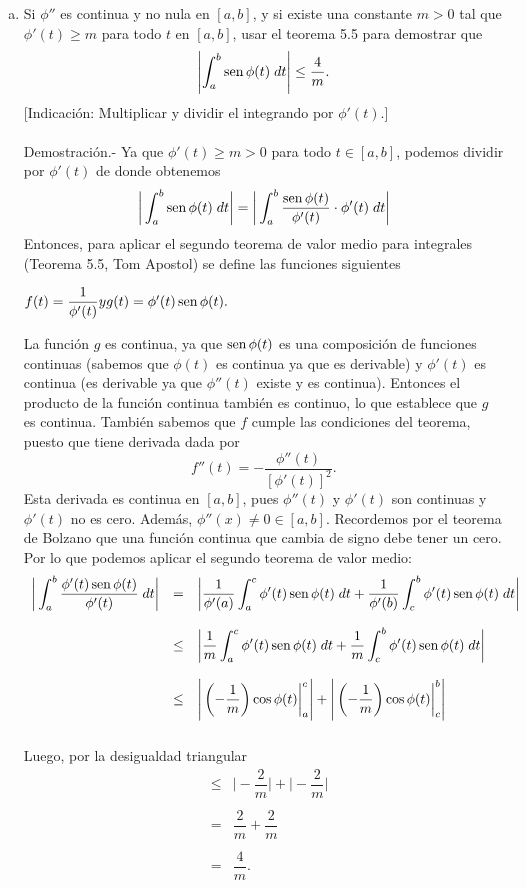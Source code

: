 \begin{enumerate}[\bfseries 1.]
\begin{enumerate}[a)]
	    \item Si $\phi''$ es continua y no nula en $[a,b]$, y si existe una constante $m>0$ tal que $\phi'(t)\geq m$ para todo $t$ en $[a,b]$, usar el teorema 5.5 para demostrar que
	    $$\left|\int_a^b \mathop{\mbox{\normalfont sen}}\nolimits \phi(t) \; dt\right|\leq \dfrac{4}{m}.$$
	    [Indicación: Multiplicar y dividir el integrando por $\phi'(t).$]\\\\
		Demostración.-\; Ya que $\phi'(t)\geq m > 0$ para todo $t\in [a,b]$, podemos dividir por $\phi'(t)$ de donde obtenemos 
		$$\bigg|\int_a^b \mathop{\mbox{\normalfont sen}}\nolimits \phi(t)\; dt\bigg|=\bigg|\int_a^b \dfrac{\mathop{\mbox{\normalfont sen}}\nolimits \phi(t)}{\phi'(t)}\cdot \phi'(t)\; dt\bigg|$$
		Entonces, para aplicar el segundo teorema de valor medio para integrales (Teorema 5.5, Tom Apostol) se define las funciones siguientes
		\begin{center}
		    $f(t)=\dfrac{1}{\phi'(t)} y g(t)=\phi'(t)\mathop{\mbox{\normalfont sen}}\nolimits \phi(t).$
		\end{center}
		La función $g$ es continua, ya que $\mathop{\mbox{\normalfont sen}}\nolimits \phi(t)$ es una composición de funciones continuas (sabemos que $\phi(t)$ es continua ya que es derivable) y $\phi'(t)$ es continua (es derivable ya que $\phi''(t)$ existe y es continua). Entonces el producto de la función continua también es continuo, lo que establece que $g$ es continua. También sabemos que $f$ cumple las condiciones del teorema, puesto que tiene derivada dada por
		$$f''(t)=-\dfrac{\phi''(t)}{\left[\phi'(t)\right]^2}.$$
		Esta derivada es continua en $[a,b]$, pues $\phi''(t)$ y $\phi'(t)$ son continuas y $\phi'(t)$ no es cero. Además, $\phi''(x)\neq 0\in [a,b]$. Recordemos por el teorema de Bolzano que una función continua que cambia de signo debe tener un cero. Por lo que podemos aplicar el segundo teorema de valor medio:
		$$
		\begin{array}{rcl}
		    \bigg|\displaystyle\int_a^b \dfrac{\phi'(t)\mathop{\mbox{\normalfont sen}}\nolimits \phi(t)}{\phi'(t)}\; dt\bigg| &=& \bigg|\dfrac{1}{\phi'(a)}\displaystyle\int_a^c \phi'(t)\mathop{\mbox{\normalfont sen}}\nolimits \phi(t) \; dt + \dfrac{1}{\phi'(b)}\displaystyle\int_c^b \phi'(t)\mathop{\mbox{\normalfont sen}}\nolimits \phi(t)\; dt\bigg|\\\\
		    &\leq& \bigg|\dfrac{1}{m}\displaystyle\int_a^c \phi'(t)\mathop{\mbox{\normalfont sen}}\nolimits \phi(t)\; dt + \dfrac{1}{m}\displaystyle\int_c^b \phi'(t)\mathop{\mbox{\normalfont sen}}\nolimits \phi(t)\; dt\bigg|\\\\
		    &\leq & \Bigg|\left(-\dfrac{1}{m}\right)\cos \phi(t)\bigg|_a^c\Bigg| + \Bigg|\left(-\dfrac{1}{m}\right)\cos \phi(t)\bigg|_c^b\Bigg|\\\\
		\end{array}
		$$
		Luego, por la desigualdad triangular
		$$
		\begin{array}{rcl}
		    &\leq&\Bigg|-\dfrac{2}{m}\Bigg|+ \Bigg|-\dfrac{2}{m}\Bigg|\\\\
		    &=& \dfrac{2}{m}+\dfrac{2}{m}\\\\
		    &=& \dfrac{4}{m}.
		\end{array}
		$$
		\vspace{.5cm}


\end{enumerate}
\end{enumerate}
